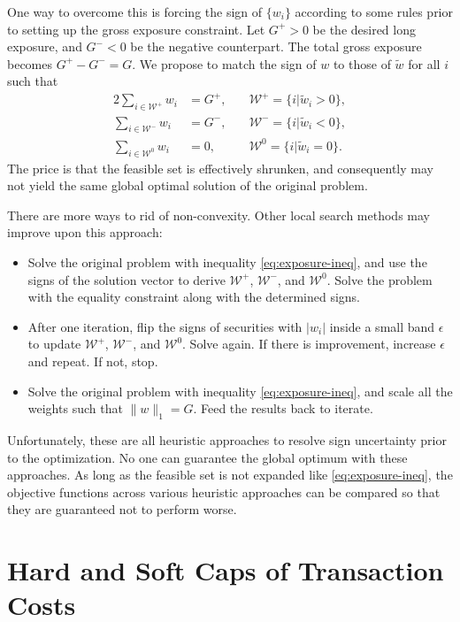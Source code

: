 \documentclass[11pt, letterpaper]{article}
\begin{document}
One way to overcome this is forcing the sign of $\{w_i\}$ according to some rules prior to setting up the gross exposure
constraint. Let $G^+ > 0$ be the desired long exposure, and $G^- < 0$ be the negative counterpart. The total gross exposure
becomes $G^+ - G^- = G$. We propose to match the sign of $w$ to those of $\tilde{w}$ for all $i$ such that
\begin{alignat*}{2}
	\sum_{i\in\mathcal{W}^+} {w_i} &= G^+,\quad & \mathcal{W}^+=\{i|\tilde{w}_i > 0\},\\
	\sum_{i\in\mathcal{W}^-} {w_i} &= G^-,\quad & \mathcal{W}^-=\{i|\tilde{w}_i < 0\},\\
	\sum_{i\in\mathcal{W}^0} {w_i} &= 0, & \mathcal{W}^0=\{i|\tilde{w}_i = 0\}.
\end{alignat*}
The price is that the feasible set is effectively shrunken, and consequently may not yield the same global optimal solution of
the original problem.

There are more ways to rid of non-convexity. Other local search methods may improve upon this approach:
\begin{itemize}
\item Solve the original problem with inequality \eqref{eq:exposure-ineq}, and use the signs of the solution vector to derive
  $\mathcal{W}^+$, $\mathcal{W}^-$, and $\mathcal{W}^0$. Solve the problem with the equality constraint along with the
  determined signs.
\item After one iteration, flip the signs of securities with $|w_i|$ inside a small band $\epsilon$ to update $\mathcal{W}^+$,
  $\mathcal{W}^-$, and $\mathcal{W}^0$. Solve again. If there is improvement, increase $\epsilon$ and repeat.  If not, stop.
\item Solve the original problem with inequality \eqref{eq:exposure-ineq}, and scale all the weights such that
  $\lVert w\rVert_1 = G$.  Feed the results back to iterate.
\end{itemize}
Unfortunately, these are all heuristic approaches to resolve sign uncertainty prior to the optimization. No one can guarantee
the global optimum with these approaches. As long as the feasible set is not expanded like \eqref{eq:exposure-ineq}, the
objective functions across various heuristic approaches can be compared so that they are guaranteed not to perform worse.

\section{Hard and Soft Caps of Transaction Costs}
\label{additional_gating}
\end{document}
